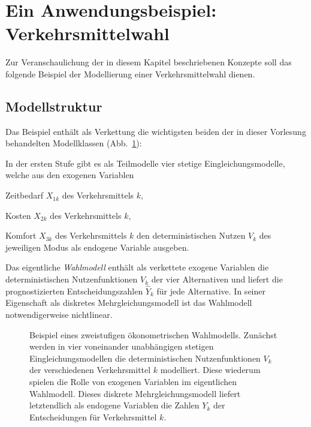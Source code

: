 \section{\label{introBsp}Ein Anwendungsbeispiel: Verkehrsmittelwahl}

Zur Veranschaulichung der in diesem Kapitel beschriebenen Konzepte
soll das folgende Beispiel der Modellierung einer Verkehrsmittelwahl
dienen. 

\subsection{Modellstruktur}

Das Beispiel enth\"alt als Verkettung die 
wichtigsten beiden der in dieser Vorlesung
behandelten Modellklassen (Abb.~\ref{fig:Aufteilung}):
\bi
\item In der ersten Stufe gibt es als Teilmodelle vier stetige
Eingleichungsmodelle, welche aus den exogenen Variablen 
\bi
\item Zeitbedarf $X_{1k}$ des Verkehrsmittels $k$,
\item Kosten $X_{2k}$ des Verkehrsmittels $k$,
\item Komfort $X_{3k}$ des Verkehrsmittels $k$
\ei
den deterministischen Nutzen $V_k$
des jeweiligen Modus als endogene Variable ausgeben.

\item Das eigentliche \emph{Wahlmodell} enth\"alt als verkettete exogene
Variablen die deterministischen Nutzenfunktionen $V_k$ 
der vier Alternativen und liefert die prognostizierten
Entscheidungszahlen $\hat{Y}_k$ f\"ur jede Alternative. In seiner
Eigenschaft als diskretes Mehrgleichungsmodell ist das Wahlmodell 
 notwendigerweise nichtlinear.
\ei

\begin{figure}
\caption{\label{fig:Aufteilung}Beispiel eines zweistufigen \"okonometrischen
Wahlmodells. Zun\"achst werden in vier
voneinander unabh\"angigen stetigen Eingleichungsmodellen
 die deterministischen Nutzenfunktionen $V_k$
der verschiedenen Verkehrsmittel $k$ modelliert. Diese wiederum
spielen die Rolle von exogenen Variablen im eigentlichen Wahlmodell.
Dieses diskrete Mehrgleichungsmodell liefert letztendlich als endogene Variablen 
die Zahlen $Y_k$ der Entscheidungen f\"ur
Verkehrsmittel $k$. 
}
\end{figure}


